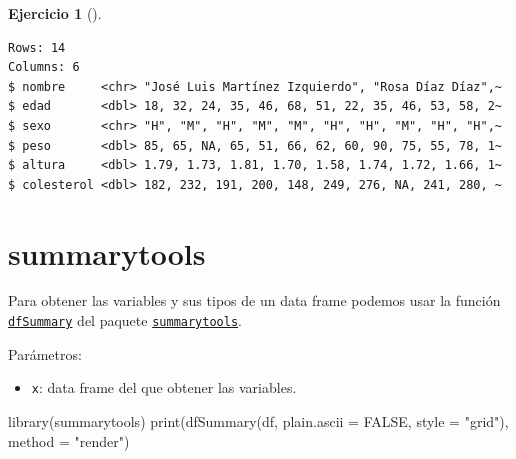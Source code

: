 \documentclass[
  a4paper,
]{scrreport}
\newenvironment{Shaded}{\begin{snugshade}}{\end{snugshade}}
\newcommand{\AttributeTok}[1]{\textcolor[rgb]{0.40,0.45,0.13}{#1}}
\newcommand{\ConstantTok}[1]{\textcolor[rgb]{0.56,0.35,0.01}{#1}}
\newcommand{\FunctionTok}[1]{\textcolor[rgb]{0.28,0.35,0.67}{#1}}
\newcommand{\NormalTok}[1]{\textcolor[rgb]{0.00,0.23,0.31}{#1}}
\newcommand{\StringTok}[1]{\textcolor[rgb]{0.13,0.47,0.30}{#1}}
\providecommand{\tightlist}{%
  \setlength{\itemsep}{0pt}\setlength{\parskip}{0pt}}\usepackage{longtable,booktabs,array}
\theoremstyle{definition}
\newtheorem{exercise}{Ejercicio}[chapter]
\theoremstyle{remark}
\begin{document}
\begin{exercise}[]
\begin{enumerate}
\begin{tcolorbox}
\begin{verbatim}
Rows: 14
Columns: 6
$ nombre     <chr> "José Luis Martínez Izquierdo", "Rosa Díaz Díaz",~
$ edad       <dbl> 18, 32, 24, 35, 46, 68, 51, 22, 35, 46, 53, 58, 2~
$ sexo       <chr> "H", "M", "H", "M", "M", "H", "H", "M", "H", "H",~
$ peso       <dbl> 85, 65, NA, 65, 51, 66, 62, 60, 90, 75, 55, 78, 1~
$ altura     <dbl> 1.79, 1.73, 1.81, 1.70, 1.58, 1.74, 1.72, 1.66, 1~
$ colesterol <dbl> 182, 232, 191, 200, 148, 249, 276, NA, 241, 280, ~
\end{verbatim}

  \section{summarytools}

  Para obtener las variables y sus tipos de un data frame podemos usar
  la función
  \href{https://www.rdocumentation.org/packages/summarytools/versions/1.1.4/topics/dfSummary}{\texttt{dfSummary}}
  del paquete
  \href{https://www.rdocumentation.org/packages/summarytools}{\texttt{summarytools}}.

  Parámetros:

  \begin{itemize}
  \tightlist
  \item
    \texttt{x}: data frame del que obtener las variables.
  \end{itemize}

\begin{Shaded}
\begin{Highlighting}[]
\FunctionTok{library}\NormalTok{(summarytools)}
\FunctionTok{print}\NormalTok{(}\FunctionTok{dfSummary}\NormalTok{(df, }\AttributeTok{plain.ascii =} \ConstantTok{FALSE}\NormalTok{, }\AttributeTok{style =} \StringTok{"grid"}\NormalTok{), }\AttributeTok{method =} \StringTok{"render"}\NormalTok{)}
\end{Highlighting}
\end{Shaded}


\end{tcolorbox}
\end{enumerate}
\end{exercise}
\end{document}
